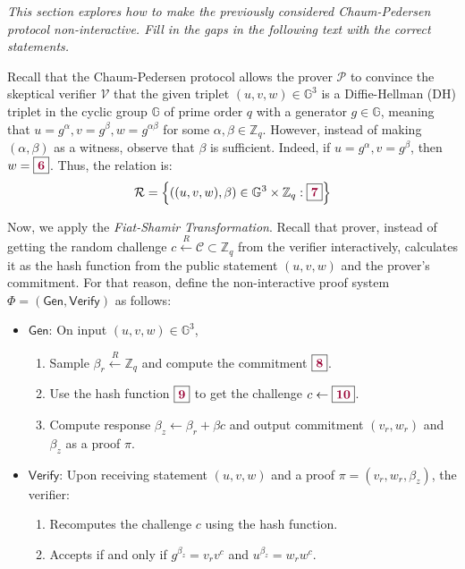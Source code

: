 \documentclass{zkdl-tests-template}
\begin{document}
\begin{tcolorbox}[colback=gray!10!white,fonttitle=\bfseries,colframe=purple!80!black,title=Exercises 6-10. Non-Interactive Chaum-Pedersen Protocol.]
    \textit{This section explores how to make the previously considered Chaum-Pedersen protocol non-interactive. Fill in the gaps in the following text with the correct statements.}
    \vspace{10px}

    Recall that the Chaum-Pedersen protocol allows the prover $\mathcal{P}$ to convince the skeptical verifier $\mathcal{V}$ that the given triplet $(u,v,w) \in \mathbb{G}^3$ is a Diffie-Hellman (DH) triplet in the cyclic group $\mathbb{G}$ of prime order $q$ with a generator $g \in \mathbb{G}$, meaning that $u=g^{\alpha},v=g^{\beta},w=g^{\alpha\beta}$ for some $\alpha,\beta \in \mathbb{Z}_q$. However, instead of making $(\alpha,\beta)$ as a witness, observe that $\beta$ is sufficient. Indeed, if $u=g^{\alpha},v=g^{\beta}$, then $w=\boxed{\textcolor{purple!80!black}{\textbf{6}}}$. Thus, the relation is:
    \begin{equation*}
        \mathcal{R} = \left\{ ((u,v,w), \beta) \in \mathbb{G}^3 \times \mathbb{Z}_q: \boxed{\textcolor{purple!80!black}{\textbf{7}}} \right\}
    \end{equation*}

    Now, we apply the \textit{Fiat-Shamir Transformation}. Recall that prover, instead of getting the random challenge $c \xleftarrow{R} \mathcal{C} \subset \mathbb{Z}_q$ from the verifier interactively, calculates it as the hash function from the public statement $(u,v,w)$ and the prover's commitment. For that reason, define the non-interactive proof system $\Phi = (\mathsf{Gen}, \mathsf{Verify})$ as follows:
    \begin{itemize}
        \item $\mathsf{Gen}$: On input $(u,v,w) \in \mathbb{G}^3$, 
        \begin{enumerate}
            \item Sample $\beta_r \xleftarrow{R} \mathbb{Z}_q$ and compute the commitment $\boxed{\textcolor{purple!80!black}{\textbf{8}}}$.
            \item Use the hash function $\boxed{\textcolor{purple!80!black}{\textbf{9}}}$ to get the challenge $c \gets \boxed{\textcolor{purple!80!black}{\textbf{10}}}$.
            \item Compute response $\beta_z \gets \beta_r + \beta c$ and output commitment $(v_r,w_r)$ and $\beta_z$ as a proof $\pi$.
        \end{enumerate}
        \item $\mathsf{Verify}$: Upon receiving statement $(u,v,w)$ and a proof $\pi=(v_r,w_r,\beta_z)$, the verifier:
        \begin{enumerate}
            \item Recomputes the challenge $c$ using the hash function.
            \item Accepts if and only if $g^{\beta_z} = v_r v^c$ and $u^{\beta_z} = w_r w^c$.
        \end{enumerate}
    \end{itemize}


\end{tcolorbox}
\end{document}
